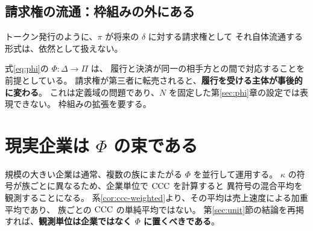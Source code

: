 \subsection{請求権の流通：枠組みの外にある}
\label{sec:token-limit}

トークン発行のように、$\pi$ が将来の $\delta$ に対する請求権として
それ自体流通する形式は、依然として扱えない。

式\eqref{eq:phi}の $\Phi:\Delta\to\Pi$ は、
履行と決済が同一の相手方との間で対応することを前提としている。
請求権が第三者に転売されると、\textbf{履行を受ける主体が事後的に変わる}。
これは定義域の問題であり、$N$ を固定した第\ref{sec:phi}章の設定では表現できない。
枠組みの拡張を要する。

\section{現実企業は \texorpdfstring{$\Phi$}{Φ} の束である}

規模の大きい企業は通常、複数の族にまたがる $\Phi$ を並行して運用する。
$\kappa$ の符号が族ごとに異なるため、企業単位で $\mathrm{CCC}$ を計算すると
異符号の混合平均を観測することになる。
系\ref{cor:ccc-weighted}より、その平均は売上速度による加重平均であり、
族ごとの $\mathrm{CCC}$ の単純平均ではない。
第\ref{sec:unit}節の結論を再掲すれば、\textbf{観測単位は企業ではなく $\Phi$ に置くべきである}。

